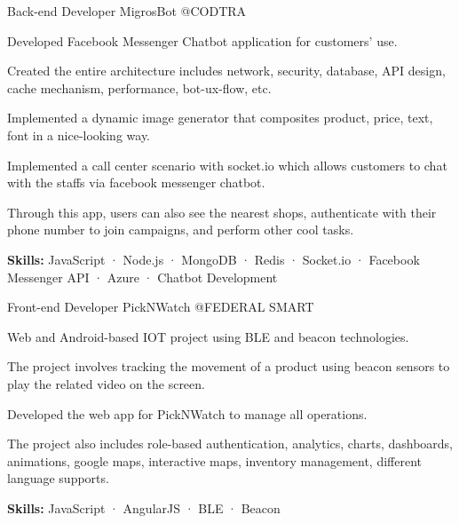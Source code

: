 \begin{cventries}
  \cventry
    {Back-end Developer} %
    {MigrosBot} %
    {@CODTRA} %
    {}
    {
      \begin{cvitems} %
        \item {Developed Facebook Messenger Chatbot application for customers' use.}
        \item {Created the entire architecture includes network, security, database, API design, cache mechanism, performance, bot-ux-flow, etc.}
        \item {Implemented a dynamic image generator that composites product, price, text, font in a nice-looking way.}
        \item {Implemented a call center scenario with socket.io which allows customers to chat with the staffs via facebook messenger chatbot.}
        \item {Through this app, users can also see the nearest shops, authenticate with their phone number to join campaigns, and perform other cool tasks.}
        \item {\textbf {Skills:} JavaScript · Node.js · MongoDB · Redis · Socket.io · Facebook Messenger API · Azure · Chatbot Development}
      \end{cvitems}
    }

  \cventry
    {Front-end Developer} %
    {PickNWatch} %
    {@FEDERAL SMART} %
    {}
    {
      \begin{cvitems} %
        \item {Web and Android-based IOT project using BLE and beacon technologies.}
        \item {The project involves tracking the movement of a product using beacon sensors to play the related video on the screen.}
        \item {Developed the web app for PickNWatch to manage all operations.}
        \item {The project also includes role-based authentication, analytics, charts, dashboards, animations, google maps, interactive maps, inventory management, different language supports.}
        \item {\textbf {Skills:} JavaScript · AngularJS · BLE · Beacon}
      \end{cvitems}
    }

\end{cventries}
